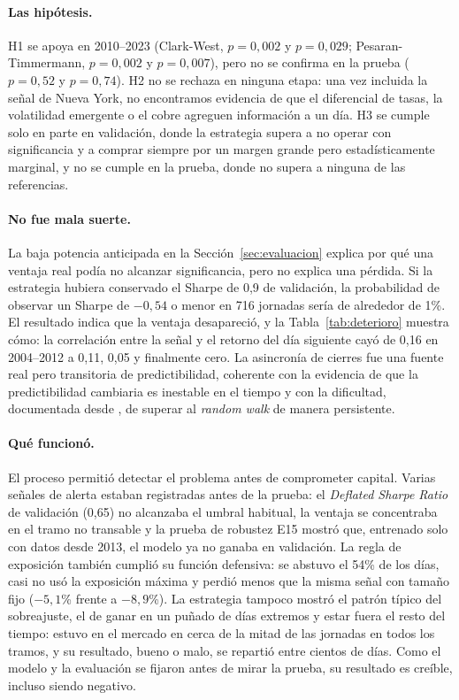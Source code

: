 \documentclass[11pt,a4paper]{article}
\begin{document}
\paragraph{Las hipótesis.} H1 se apoya en 2010--2023 (Clark-West, \(p=0{,}002\) y \(p=0{,}029\); Pesaran-Timmermann, \(p=0{,}002\) y \(p=0{,}007\)), pero no se confirma en la prueba (\(p=0{,}52\) y \(p=0{,}74\)). H2 no se rechaza en ninguna etapa: una vez incluida la señal de Nueva York, no encontramos evidencia de que el diferencial de tasas, la volatilidad emergente o el cobre agreguen información a un día. H3 se cumple solo en parte en validación, donde la estrategia supera a no operar con significancia y a comprar siempre por un margen grande pero estadísticamente marginal, y no se cumple en la prueba, donde no supera a ninguna de las referencias.

\paragraph{No fue mala suerte.} La baja potencia anticipada en la Sección~\ref{sec:evaluacion} explica por qué una ventaja real podía no alcanzar significancia, pero no explica una pérdida. Si la estrategia hubiera conservado el Sharpe de 0,9 de validación, la probabilidad de observar un Sharpe de $-0{,}54$ o menor en 716 jornadas sería de alrededor de 1\%. El resultado indica que la ventaja desapareció, y la Tabla~\ref{tab:deterioro} muestra cómo: la correlación entre la señal y el retorno del día siguiente cayó de 0,16 en 2004--2012 a 0,11, 0,05 y finalmente cero. La asincronía de cierres fue una fuente real pero transitoria de predictibilidad, coherente con la evidencia de que la predictibilidad cambiaria es inestable en el tiempo \citep{rossi2013} y con la dificultad, documentada desde \citet{meese1983}, de superar al \emph{random walk} de manera persistente.

\paragraph{Qué funcionó.} El proceso permitió detectar el problema antes de comprometer capital. Varias señales de alerta estaban registradas antes de la prueba: el \emph{Deflated Sharpe Ratio} de validación (0,65) no alcanzaba el umbral habitual, la ventaja se concentraba en el tramo no transable y la prueba de robustez E15 mostró que, entrenado solo con datos desde 2013, el modelo ya no ganaba en validación. La regla de exposición también cumplió su función defensiva: se abstuvo el 54\% de los días, casi no usó la exposición máxima y perdió menos que la misma señal con tamaño fijo ($-5{,}1$\% frente a $-8{,}9$\%). La estrategia tampoco mostró el patrón típico del sobreajuste, el de ganar en un puñado de días extremos y estar fuera el resto del tiempo: estuvo en el mercado en cerca de la mitad de las jornadas en todos los tramos, y su resultado, bueno o malo, se repartió entre cientos de días. Como el modelo y la evaluación se fijaron antes de mirar la prueba, su resultado es creíble, incluso siendo negativo.
\end{document}

